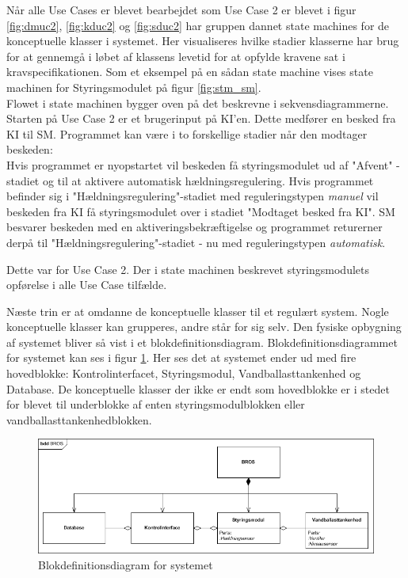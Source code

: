 Når alle Use Cases er blevet bearbejdet som Use Case 2 er blevet i figur \ref{fig:dmuc2}, \ref{fig:kduc2} og \ref{fig:sduc2} har gruppen dannet state machines for de konceptuelle klasser i systemet. Her visualiseres hvilke stadier klasserne har brug for at gennemgå i løbet af klassens levetid for at opfylde kravene sat i kravspecifikationen. Som et eksempel på en sådan state machine vises state machinen for Styringsmodulet på figur \ref{fig:stm_sm}. \\Flowet i state machinen bygger oven på det beskrevne i sekvensdiagrammerne. Starten på Use Case 2 er et brugerinput på KI'en. Dette medfører en besked fra KI til SM. Programmet kan være i to forskellige stadier når den modtager beskeden:\\
Hvis programmet er nyopstartet vil beskeden få styringsmodulet ud af "Afvent" -stadiet og til at aktivere automatisk hældningsregulering. Hvis programmet befinder sig i "Hældningsregulering"-stadiet med reguleringstypen \textit{manuel} vil beskeden fra KI få styringsmodulet over i stadiet "Modtaget besked fra KI". SM besvarer beskeden med en aktiveringsbekræftigelse og programmet returerner derpå til "Hældningsregulering"-stadiet - nu med reguleringstypen \textit{automatisk}.

Dette var for Use Case 2. Der i state machinen beskrevet styringsmodulets opførelse i alle Use Case tilfælde. 

Næste trin er at omdanne de konceptuelle klasser til et regulært system. Nogle konceptuelle klasser kan grupperes, andre står for sig selv. Den fysiske opbygning af systemet bliver så vist i et blokdefinitionsdiagram. Blokdefinitionsdiagrammet for 
systemet kan ses i figur \ref{fig:bdd_bros}. Her ses det at systemet ender ud med fire hovedblokke: Kontrolinterfacet, Styringsmodul, Vandballasttankenhed og Database. De konceptuelle klasser der ikke er endt som hovedblokke er i stedet for blevet til underblokke af enten styringsmodulblokken eller vandballasttankenhedblokken.

\begin{figure}[htbp]
\centering
\includegraphics[scale=0.8]{billeder/Systemarkitektur/bdd_bros}
\caption{Blokdefinitionsdiagram for systemet}
\label{fig:bdd_bros}
\end{figure}

